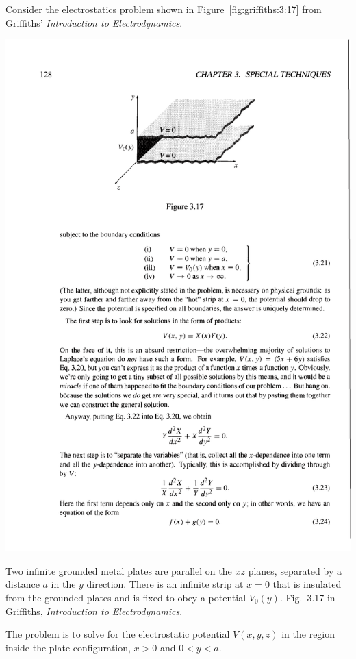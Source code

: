 Consider the electrostatics problem shown in Figure~\ref{fig:griffiths:3:17} from Griffiths' \emph{Introduction to Electrodynamics}.
\begin{marginfigure}
    \centering
    \includegraphics[width=\textwidth]{figures/GriffithsEM3_17.pdf}
    \caption{Two infinite grounded metal plates are parallel on the $xz$ planes, separated by a distance $a$ in the $y$ direction. There is an infinite strip at $x=0$ that is insulated from the grounded plates and is fixed to obey a potential $V_0(y)$. Fig.~3.17 in Griffiths, \emph{Introduction to Electrodynamics}.}
    \label{fig:griffiths:3:17}
\end{marginfigure}
The problem is to solve for the electrostatic potential $V(x,y,z)$ in the region inside the plate configuration, $x>0$ and $0<y<a$.

